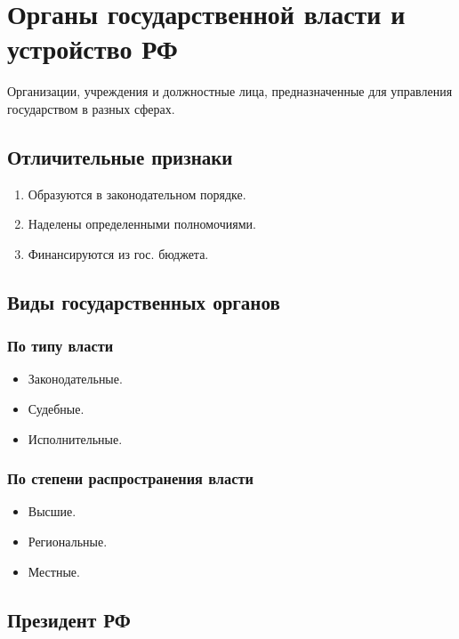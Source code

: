 \documentclass[12pt]{article}
\begin{document}
	\section{Органы государственной власти и устройство РФ}
	
	\begin{definition}
		Организации, учреждения и должностные лица, предназначенные для управления государством в разных сферах.
	\end{definition}
	
	\subsection{Отличительные признаки}
	\begin{enumerate}
		\item Образуются в законодательном порядке.
		\item Наделены определенными полномочиями.
		\item Финансируются из гос. бюджета.
	\end{enumerate}
	
	\subsection{Виды государственных органов}
	
	\subsubsection{По типу власти}
	
	\begin{itemize}
		\item Законодательные.
		\item Судебные.
		\item Исполнительные.
	\end{itemize}
	
	\subsubsection{По степени распространения власти}
	
	\begin{itemize}
		\item Высшие.
		\item Региональные.
		\item Местные.
	\end{itemize}
	
	\subsection{Президент РФ}
	
\end{document}
